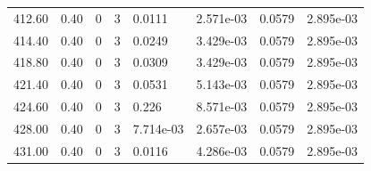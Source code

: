 \documentclass[preview]{standalone}
\begin{document}
{{{{\begin{tabular}{L{1.2cm}C{1.2cm} C{0.3cm}C{0.5cm} C{1.4cm}C{1.4cm} C{1.4cm}C{1.4cm}}
  412.60  &  0.40  & 0     &  3 &  0.0111  & 2.571e-03  & 0.0579 &  2.895e-03   \\ 
  414.40  &  0.40  & 0     &  3 &  0.0249  & 3.429e-03  & 0.0579 &  2.895e-03   \\ 
  418.80  &  0.40  & 0     &  3 &  0.0309  & 3.429e-03  & 0.0579 &  2.895e-03   \\ 
  421.40  &  0.40  & 0     &  3 &  0.0531  & 5.143e-03  & 0.0579 &  2.895e-03   \\ 
  424.60  &  0.40  & 0     &  3 &  0.226  & 8.571e-03  & 0.0579 &  2.895e-03   \\ 
  428.00  &  0.40  & 0     &  3 &  7.714e-03  & 2.657e-03  & 0.0579 &  2.895e-03   \\ 
  431.00  &  0.40  & 0     &  3 &  0.0116  & 4.286e-03  & 0.0579 &  2.895e-03   \\ 
\hline 
\end{tabular} 

}}}}
\end{document}
